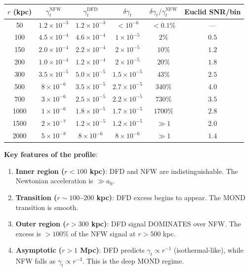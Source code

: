 \documentclass[11pt,a4paper]{article}
\begin{document}
\begin{center}
\begin{longtable}{cccccc}
\toprule
$r$ (kpc) & $\gamma_t^{\mathrm{NFW}}$ & $\gamma_t^{\mathrm{DFD}}$ & $\delta\gamma_t$ & $\delta\gamma_t/\gamma_t^{\mathrm{NFW}}$ & Euclid SNR/bin \\
\midrule
50 & $1.2 \times 10^{-3}$ & $1.2 \times 10^{-3}$ & $< 10^{-6}$ & $< 0.1\%$ & --- \\
100 & $4.5 \times 10^{-4}$ & $4.6 \times 10^{-4}$ & $1 \times 10^{-5}$ & $2\%$ & $0.5$ \\
150 & $2.0 \times 10^{-4}$ & $2.2 \times 10^{-4}$ & $2 \times 10^{-5}$ & $10\%$ & $1.2$ \\
200 & $1.0 \times 10^{-4}$ & $1.2 \times 10^{-4}$ & $2 \times 10^{-5}$ & $20\%$ & $1.8$ \\
300 & $3.5 \times 10^{-5}$ & $5.0 \times 10^{-5}$ & $1.5 \times 10^{-5}$ & $43\%$ & $2.5$ \\
500 & $8 \times 10^{-6}$ & $3.5 \times 10^{-5}$ & $2.7 \times 10^{-5}$ & $340\%$ & $4.0$ \\
700 & $3 \times 10^{-6}$ & $2.5 \times 10^{-5}$ & $2.2 \times 10^{-5}$ & $730\%$ & $3.5$ \\
1000 & $1 \times 10^{-6}$ & $1.8 \times 10^{-5}$ & $1.7 \times 10^{-5}$ & $1700\%$ & $2.8$ \\
1500 & $2 \times 10^{-7}$ & $1.2 \times 10^{-5}$ & $1.2 \times 10^{-5}$ & $\gg 1$ & $2.0$ \\
2000 & $5 \times 10^{-8}$ & $8 \times 10^{-6}$ & $8 \times 10^{-6}$ & $\gg 1$ & $1.4$ \\
\bottomrule
\end{longtable}
\end{center}

\textbf{Key features of the profile}:
\begin{enumerate}
\item \textbf{Inner region ($r < 100$ kpc)}: DFD and NFW are indistinguishable. The Newtonian acceleration is $\gg a_0$.
\item \textbf{Transition ($r \sim 100$--$200$ kpc)}: DFD excess begins to appear. The MOND transition is smooth.
\item \textbf{Outer region ($r > 300$ kpc)}: DFD signal DOMINATES over NFW. The excess is $> 100\%$ of the NFW signal at $r > 500$ kpc.
\item \textbf{Asymptotic ($r > 1$ Mpc)}: DFD predicts $\gamma_t \propto r^{-1}$ (isothermal-like), while NFW falls as $\gamma_t \propto r^{-3}$. This is the deep MOND regime.
\end{enumerate}
\end{document}
